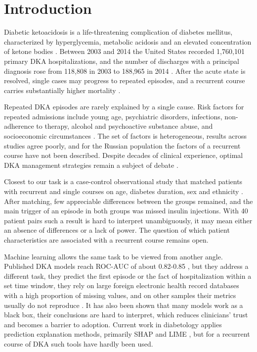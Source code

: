 \documentclass[pdflatex,sn-basic,Numbered]{sn-jnl}
\begin{document}
\maketitle

\section{Introduction}\label{sec1}

Diabetic ketoacidosis is a life-threatening complication of diabetes mellitus, characterized by hyperglycemia, metabolic acidosis and an elevated concentration of ketone bodies \cite{ref1}. Between 2003 and 2014 the United States recorded 1,760,101 primary DKA hospitalizations, and the number of discharges with a principal diagnosis rose from 118,808 in 2003 to 188,965 in 2014 \cite{ref2}. After the acute state is resolved, single cases may progress to repeated episodes, and a recurrent course carries substantially higher mortality \cite{ref3,ref4}.

Repeated DKA episodes are rarely explained by a single cause. Risk factors for repeated admissions include young age, psychiatric disorders, infections, non-adherence to therapy, alcohol and psychoactive substance abuse, and socioeconomic circumstances \cite{ref5,ref6,ref7}. The set of factors is heterogeneous, results across studies agree poorly, and for the Russian population the factors of a recurrent course have not been described. Despite decades of clinical experience, optimal DKA management strategies remain a subject of debate \cite{ref8}.

Closest to our task is a case-control observational study that matched patients with recurrent and single courses on age, diabetes duration, sex and ethnicity \cite{ref9}. After matching, few appreciable differences between the groups remained, and the main trigger of an episode in both groups was missed insulin injections. With 40 patient pairs such a result is hard to interpret unambiguously, it may mean either an absence of differences or a lack of power. The question of which patient characteristics are associated with a recurrent course remains open.

Machine learning allows the same task to be viewed from another angle. Published DKA models reach ROC-AUC of about 0.82-0.85 \cite{ref10,ref11}, but they address a different task, they predict the first episode or the fact of hospitalization within a set time window, they rely on large foreign electronic health record databases with a high proportion of missing values, and on other samples their metrics usually do not reproduce \cite{ref11}. It has also been shown \cite{ref12,ref13} that many models work as a black box, their conclusions are hard to interpret, which reduces clinicians' trust and becomes a barrier to adoption. Current work in diabetology applies prediction explanation methods, primarily SHAP and LIME \cite{ref14,ref15}, but for a recurrent course of DKA such tools have hardly been used.
\end{document}
